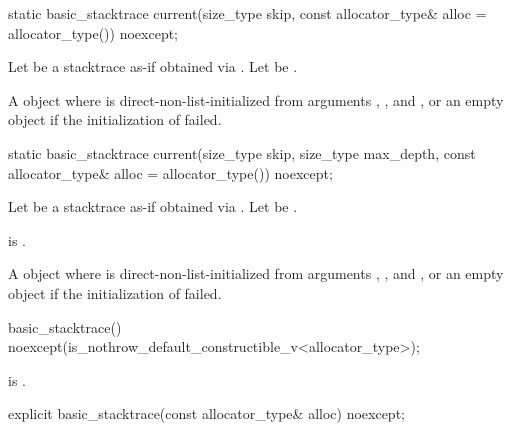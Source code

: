 %
\begin{itemdecl}
static basic_stacktrace current(size_type skip,
                                const allocator_type& alloc = allocator_type()) noexcept;
\end{itemdecl}

\begin{itemdescr}
\pnum
Let  be a stacktrace
as-if obtained via .
Let  be .

\pnum
\returns
A  object
where  is direct-non-list-initialized from arguments
, , and ,
or an empty  object
if the initialization of  failed.
\end{itemdescr}

%
\begin{itemdecl}
static basic_stacktrace current(size_type skip, size_type max_depth,
                                const allocator_type& alloc = allocator_type()) noexcept;
\end{itemdecl}

\begin{itemdescr}
\pnum
Let  be a stacktrace
as-if obtained via .
Let  be .

\pnum
\expects
{} is .

\pnum
\returns
A  object
where  is direct-non-list-initialized from arguments
, ,
and ,
or an empty  object
if the initialization of  failed.
\end{itemdescr}

%
\begin{itemdecl}
basic_stacktrace() noexcept(is_nothrow_default_constructible_v<allocator_type>);
\end{itemdecl}

\begin{itemdescr}
\pnum
\ensures
{} is .
\end{itemdescr}

%
\begin{itemdecl}
explicit basic_stacktrace(const allocator_type& alloc) noexcept;
\end{itemdecl}

